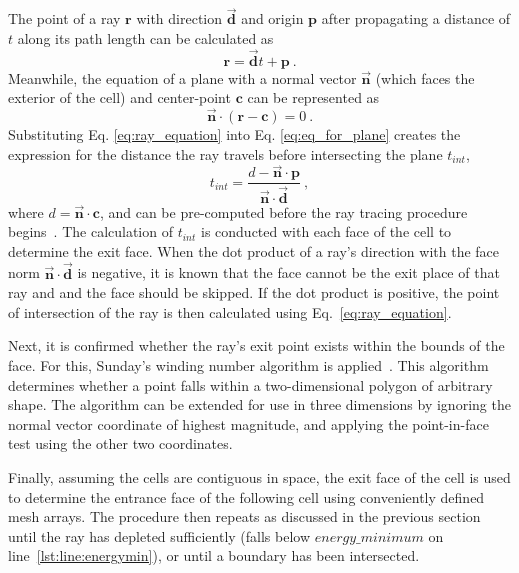 The point of a ray $\textbf{r}$ with direction $\Vec{\textbf{d}}$ and origin $\textbf{p}$ after propagating a distance of $t$ along its path length can be calculated as
\begin{equation}
    \textbf{r} = \Vec{\textbf{d}}t + \textbf{p}~.
    \label{eq:ray_equation}
\end{equation}
Meanwhile, the equation of a plane with a normal vector $\Vec{\textbf{n}}$ (which faces the exterior of the cell) and center-point $\textbf{c}$ can be represented as
\begin{equation}
    \Vec{\textbf{n}} \cdot (\textbf{r} - \textbf{c}) = 0~.
    \label{eq:eq_for_plane}
\end{equation}
Substituting Eq. \ref{eq:ray_equation} into Eq. \ref{eq:eq_for_plane} creates the expression for the distance the ray travels before intersecting the plane $t_{int}$,
\begin{equation}
    t_{int}=\frac{d-\Vec{\textbf{n}}\cdot\textbf{p}}{\Vec{\textbf{n}}\cdot\Vec{\textbf{d}}}~,
    \label{eq:eq_for_t}
\end{equation}
where $d=\Vec{\textbf{n}}\cdot\textbf{c}$, and can be pre-computed before the ray tracing procedure begins~\cite{Kay1986RayScenes}. The calculation of $t_{int}$ is conducted with each face of the cell to determine the exit face. When the dot product of a ray's direction with the face norm $\Vec{\textbf{n}}\cdot{}\Vec{\textbf{d}}$ is negative, it is known that the face cannot be the exit place of that ray and and the face should be skipped. If the dot product is positive, the point of intersection of the ray is then calculated using Eq.~\ref{eq:ray_equation}.


Next, it is confirmed whether the ray's exit point exists within the bounds of the face. For this, Sunday's winding number algorithm is applied~\cite{Sunday2021PracticalCode}. This algorithm determines whether a point falls within a two-dimensional polygon of arbitrary shape. The algorithm can be extended for use in three dimensions by ignoring the normal vector coordinate of highest magnitude, and applying the point-in-face test using the other two coordinates.


Finally, assuming the cells are contiguous in space, the exit face of the cell is used to determine the entrance face of the following cell using conveniently defined mesh arrays.
The procedure then repeats as discussed in the previous section until the ray has depleted sufficiently (falls below $energy\_minimum$ on line~\ref{lst:line:energymin}), or until a boundary has been intersected.

